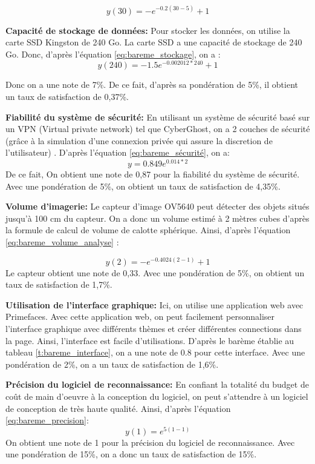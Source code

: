 \begin{equation}
    y(30) = -e^{-0.2(30-5)} + 1  \end{equation}

\textbf{Capacité de stockage de données:}
Pour stocker les données, on utilise la carte SSD Kingston de 240 Go. La carte SSD a une capacité de stockage de 240 Go. Donc, d'après l'équation \ref{eq:bareme_stockage}, on a :
\begin{equation}
    y(240) = -1.5e^{-0.002012*240} + 1
\end{equation}

Donc on a une note de 7\%. De ce fait, d'après sa pondération de 5\%, il obtient un taux de satisfaction de 0,37\%.


\textbf{Fiabilité du système de sécurité:}
En utilisant un système de sécurité basé sur un VPN (Virtual private network) tel que CyberGhost, on a 2 couches de sécurité (grâce à la simulation d’une connexion privée qui assure la discretion de l'utilisateur) . D'après l'équation \ref{eq:bareme_sécurité}, on a:
\begin{equation}
    y = 0.849 e^{0.014*2}
\end{equation}
De ce fait, On obtient une note de 0,87 pour la fiabilité du système de sécurité. Avec une pondération de 5\%, on obtient un taux de satisfaction de 4,35\%.

\textbf{Volume d'imagerie:}
Le capteur d'image OV5640 peut détecter des objets situés jusqu'à 100 cm du capteur. On a donc un volume estimé à 2 mètres cubes d'après la formule de calcul de volume de calotte sphérique. Ainsi, d'après l'équation \ref{eq:bareme_volume_analyse} :

\begin{equation}
y(2) =
        -e^{-0.4024(2-1)}+1 
\end{equation}
Le capteur obtient une note de 0,33. Avec une pondération de 5\%, on obtient un taux de satisfaction de 1,7\%.

\textbf{Utilisation de l'interface graphique:}
Ici, on utilise une application web avec Primefaces. Avec cette application web, on peut facilement personnaliser l'interface graphique avec différents thèmes et créer différentes connections dans la page. Ainsi, l'interface est facile d'utilisations. D'après le barème établie au tableau \ref{t:bareme_interface}, on a une note de 0.8 pour cette interface. Avec une pondération de 2\%, on a un taux de satisfaction de 1,6\%.

\textbf{Précision du logiciel de reconnaissance:}
En confiant la totalité du budget de coût de main d'oeuvre à la conception du logiciel, on peut s'attendre à un logiciel de conception de très haute qualité. Ainsi, d'après l'équation \ref{eq:bareme_precision}:
\begin{equation}
    y(1) = e^{5(1-1)}
\end{equation}
On obtient une note de 1 pour la précision du logiciel de reconnaissance. Avec une pondération de 15\%, on a donc un taux de satisfaction de 15\%.

